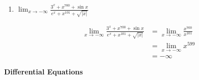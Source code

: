 \documentclass{article}
\begin{document}
\begin{enumerate}
\begin{enumerate}
        \begin{solution}
          \begin{align*}
              \lim_{x\to \infty} \frac{3^x + x^{700} + x\ln x}{e^x + \sqrt{x}\ln x} &= \lim_{x\to \infty} \frac{3^x}{e^x}\\
              &= \lim_{x\to \infty} \left(\frac{3}{e}\right)^x\\
              &= \boxed{\infty}
          \end{align*}
        \end{solution}
        \probonly{\vfill}
        
        \item $\displaystyle{\lim_{x\to -\infty} \frac{3^x + x^{700} + \sin x}{e^x + x^{101} + \sqrt{|x|}}}$
        
        \begin{solution}
          \begin{align*}
          \lim_{x\to -\infty} \frac{3^x + x^{700} + \sin x}{e^x + x^{101} + \sqrt{|x|}} &= \lim_{x \to -\infty}\frac{x^{700}}{x^{101}}\\
          &= \lim_{x \to -\infty} x^{599} \\
          &= \boxed{-\infty}
          \end{align*}
        \end{solution}
        \probonly{\vfill}


    \end{enumerate}
\end{enumerate}

\newpage

{\large\textbf{Differential Equations}}

\end{document}
